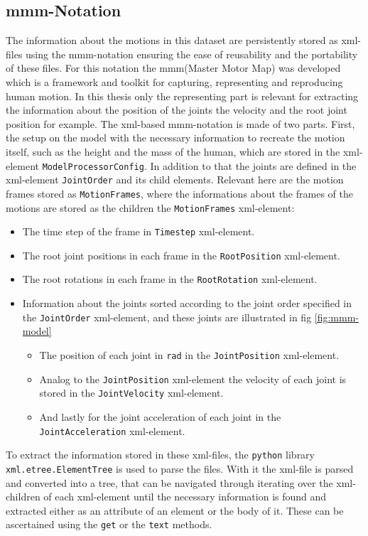 \subsection{mmm-Notation} \label{subsec:mmm-notation}
The information about the motions in this dataset are persistently stored as xml-files using the mmm-notation ensuring the ease of reusability and the portability of these files. For this notation the mmm(Master Motor Map) was developed which is a framework and toolkit for capturing, representing and reproducing human motion. In this thesis only the representing part is relevant for extracting the information about the position of the joints the velocity and the root joint position for example\cite{mmm2014}. The xml-based mmm-notation is made of two parts. First, the setup on the model with the necessary information to recreate the motion itself, such as the height and the mass of the human, which are stored in the xml-element \texttt{ModelProcessorConfig}. In addition to that the joints are defined in the xml-element \texttt{JointOrder} and its child elements. Relevant here are the motion frames stored as \texttt{MotionFrames}, where the informations about the frames of the motions are stored as the children the \texttt{MotionFrames} xml-element:
\begin{itemize}
	\item The time step of the frame in \texttt{Timestep} xml-element.
	\item The root joint positions in each frame in the \texttt{RootPosition} xml-element.
	\item The root rotations in each frame in the \texttt{RootRotation} xml-element.
	\item Information about the joints sorted according to the joint order specified in the \texttt{JointOrder} xml-element, and these joints are illustrated in fig \ref{fig:mmm-model}
	\begin{itemize}
		\item The position of each joint in \texttt{rad} in the \texttt{JointPosition} xml-element.
		\item Analog to the \texttt{JointPosition} xml-element the velocity of each joint is stored in the \texttt{JointVelocity} xml-element.
		\item And lastly for the joint acceleration of each joint in the \\\texttt{JointAcceleration} xml-element.
	\end{itemize}
\end{itemize}
To extract the information stored in these xml-files, the \texttt{python} library \\\texttt{xml.etree.ElementTree} is used to parse the files. With it the xml-file is parsed and converted into a tree, that can be navigated through iterating over the xml-children of each xml-element until the necessary information is found and extracted either as an attribute of an element or the body of it. These can be ascertained using the \texttt{get} or the \texttt{text} methods. 
